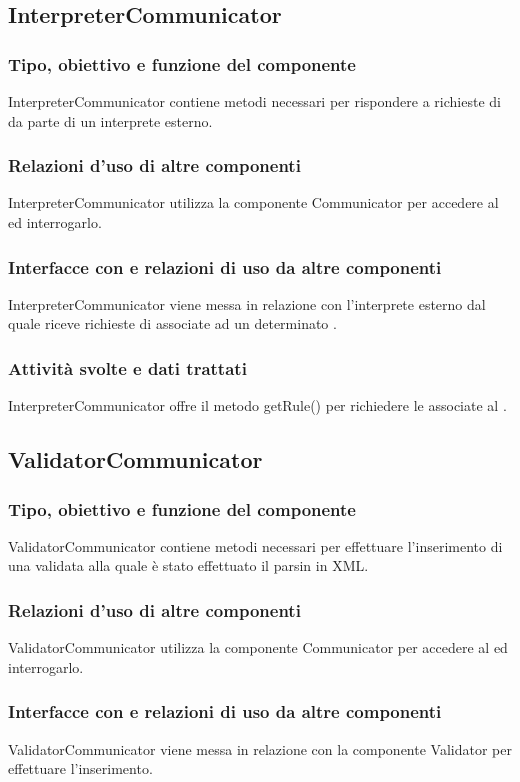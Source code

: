 \documentclass[11pt,titlepage,a4paper]{report}
\begin{document}
\subsection{InterpreterCommunicator}
\subsubsection{Tipo, obiettivo e funzione del componente}
InterpreterCommunicator contiene metodi necessari per rispondere a richieste di \br da parte di un interprete esterno.
\subsubsection{Relazioni d'uso di altre componenti}
InterpreterCommunicator utilizza la componente Communicator per accedere al \re ed interrogarlo.
\subsubsection{Interfacce con e relazioni di uso da altre componenti}
InterpreterCommunicator viene messa in relazione con l'interprete esterno dal quale riceve richieste di \brs associate ad un determinato \bo.
\subsubsection{Attivit\`a svolte e dati trattati}
InterpreterCommunicator offre il metodo getRule() per richiedere le \br associate al \bo.

\subsection{ValidatorCommunicator}
\subsubsection{Tipo, obiettivo e funzione del componente}
ValidatorCommunicator contiene metodi necessari per effettuare l'inserimento di una \br validata alla quale \`e stato effettuato il parsin in XML.
\subsubsection{Relazioni d'uso di altre componenti}
ValidatorCommunicator utilizza la componente Communicator per accedere al \re ed interrogarlo.
\subsubsection{Interfacce con e relazioni di uso da altre componenti}
ValidatorCommunicator viene messa in relazione con la componente Validator per effettuare l'inserimento.
\end{document}

